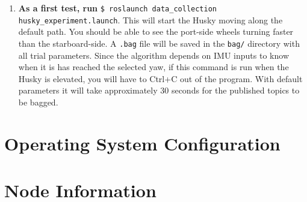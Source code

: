 \documentclass[
	12pt, %
]{fphw}
\newcommand{\code}[1]{\colorbox{light-gray}{\texttt{#1}}}
\begin{document}
\begin{enumerate}

\item \textbf{As a first test, run} \code{\$ roslaunch data\_collection husky\_experiment.launch}. This will start the Husky moving along the default path. You should be able to see the port-side wheels turning faster than the starboard-side. A \code{.bag} file will be saved in the \code{bag/} directory with all trial parameters. Since the algorithm depends on IMU inputs to know when it is has reached the selected yaw, if this command is run when the Husky is elevated, you will have to Ctrl+C out of the program. With default parameters it will take approximately 30 seconds for the published topics to be bagged.

\end{enumerate}


\cleardoublepage
\appendix

\section{Operating System Configuration}
\label{app:OperatingSystemConfiguration}

\section{Node Information}
\label{app:NodeInformation}
\end{document}
